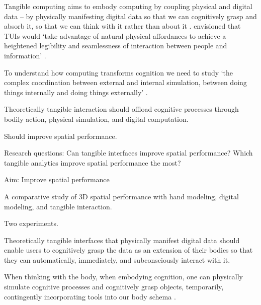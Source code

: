 

Tangible computing aims to embody computing 
by coupling physical and digital data \cite{Dourish2001} -- 
by physically manifesting digital data so that we can cognitively grasp and absorb it,
so that we can think with it rather than about it \cite{Kirsh2013}. 
\cite{Ishii1997} envisioned that TUIs would  `take advantage of natural physical affordances to achieve a heightened legibility and seamlessness of interaction between people and information' \cite{Ishii1997}. 

To understand how computing transforms cognition we need to study
`the complex coordination between external and internal simulation, between doing things internally and doing things externally' \cite{Kirsh2013}. %


Theoretically tangible interaction should offload cognitive processes through bodily action, physical simulation, and digital computation.

Should improve spatial performance.

Research questions: 
Can tangible interfaces improve spatial performance?
Which tangible analytics improve spatial performance the most?

Aim: Improve spatial performance

A comparative study of 3D spatial performance with hand modeling, digital modeling, and tangible interaction.

Two experiments. 


















Theoretically tangible interfaces that physically manifest digital data should enable users to cognitively grasp the data as an extension of their bodies so that they can automatically, immediately, and subconsciously interact with it. 


When thinking with the body, when embodying cognition, one can physically simulate cognitive processes and cognitively grasp objects, temporarily, contingently incorporating tools into our body schema \cite{Kirsh2013}.




